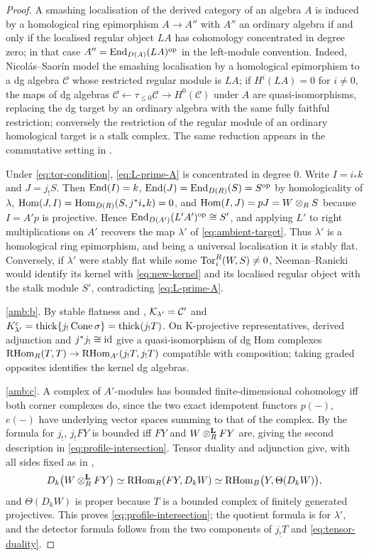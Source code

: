 \begin{proof}
A smashing localisation of the derived category of an algebra \(A\) is induced by a homological ring epimorphism \(A\to A''\) with \(A''\) an ordinary algebra if and only if the localised regular object \(LA\) has cohomology concentrated in degree zero; in that case \(A''=\operatorname{End}_{D(A)}(LA)^{\mathrm{op}}\) in the left-module convention.  Indeed, Nicolás--Saorín \cite[Theorem~5]{NicolasSaorin09} model the smashing localisation by a homological epimorphism to a dg algebra \(\mathcal C\) whose restricted regular module is \(LA\); if \(H^{i}(LA)=0\) for \(i\ne0\), the maps of dg algebras \(\mathcal C\leftarrow\tau_{\le0}\mathcal C\to H^0(\mathcal C)\) under \(A\) are quasi-isomorphisms, replacing the dg target by an ordinary algebra with the same fully faithful restriction; conversely the restriction of the regular module of an ordinary homological target is a stalk complex.  The same reduction appears in the commutative setting in \cite[proof of Theorem~4.9]{AMSTV20}.

Under \eqref{eq:tor-condition}, \eqref{eq:L-prime-A} is concentrated in degree \(0\).  Write \(I=i_*k\) and \(J=j_!S\).  Then \(\operatorname{End}(I)=k\), \(\operatorname{End}(J)=\operatorname{End}_{D(R)}(S)=S^{\mathrm{op}}\) by homologicality of \(\lambda\), \(\operatorname{Hom}(J,I)=\operatorname{Hom}_{D(R)}(S,j^*i_*k)=0\), and \(\operatorname{Hom}(I,J)=pJ=W\otimes_RS\) because \(I=A'p\) is projective.  Hence \(\operatorname{End}_{D(A')}(L'A')^{\mathrm{op}}\cong S'\), and applying \(L'\) to right multiplications on \(A'\) recovers the map \(\lambda'\) of \eqref{eq:ambient-target}.  Thus \(\lambda'\) is a homological ring epimorphism, and being a universal localisation it is stably flat.  Conversely, if \(\lambda'\) were stably flat while some \(\operatorname{Tor}_i^R(W,S)\ne0\), Neeman--Ranicki \cite{NeemanRanicki04} would identify its kernel with \eqref{eq:new-kernel} and its localised regular object with the stalk module \(S'\), contradicting \eqref{eq:L-prime-A}.

\ref{amb:b}.  By stable flatness and , \(\mathcal K_{\lambda'}=\mathcal C'\) and \(K^c_{\lambda'}=\operatorname{thick}\{j_!\operatorname{Cone}\sigma\}=\operatorname{thick}(j_!T)\).  On K-projective representatives, derived adjunction and \(j^*j_!\cong\operatorname{id}\) give a quasi-isomorphism of dg Hom complexes \(\operatorname{RHom}_R(T,T)\to\operatorname{RHom}_{A'}(j_!T,j_!T)\) compatible with composition; taking graded opposites identifies the kernel dg algebras.

\ref{amb:c}.  A complex of \(A'\)-modules has bounded finite-dimensional cohomology iff both corner complexes do, since the two exact idempotent functors \(p(-)\), \(e(-)\) have underlying vector spaces summing to that of the complex.  By the formula for \(j_!\), \(j_!FY\) is bounded iff \(FY\) and \(W\otimes^{\mathbf L}_RFY\) are, giving the second description in \eqref{eq:profile-intersection}.  Tensor duality and adjunction give, with all sides fixed as in ,
\[
 D_k\bigl(W\otimes^{\mathbf L}_RFY\bigr)\simeq\operatorname{RHom}_R(FY,D_kW)\simeq\operatorname{RHom}_B\bigl(Y,\Theta(D_kW)\bigr),
\]
and \(\Theta(D_kW)\) is proper because \(T\) is a bounded complex of finitely generated projectives.  This proves \eqref{eq:profile-intersection}; the quotient formula is  for \(\lambda'\), and the detector formula follows from the two components of \(j_!T\) and \eqref{eq:tensor-duality}.


\end{proof}
